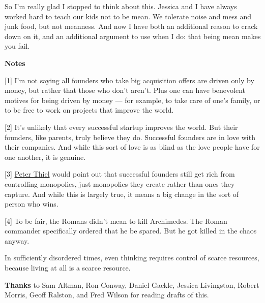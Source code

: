 So I'm really glad I stopped to think about this. Jessica and I have
always worked hard to teach our kids not to be mean. We tolerate noise
and mess and junk food, but not meanness. And now I have both an
additional reason to crack down on it, and an additional argument to use
when I do: that being mean makes you fail.

\textbf{Notes}

{[}1{]} I'm not saying all founders who take big acquisition offers are
driven only by money, but rather that those who don't aren't. Plus one
can have benevolent motives for being driven by money --- for example,
to take care of one's family, or to be free to work on projects that
improve the world.

{[}2{]} It's unlikely that every successful startup improves the world.
But their founders, like parents, truly believe they do. Successful
founders are in love with their companies. And while this sort of love
is as blind as the love people have for one another, it is genuine.

{[}3{]} \href{http://startupclass.samaltman.com/courses/lec05}{Peter
Thiel} would point out that successful founders still get rich from
controlling monopolies, just monopolies they create rather than ones
they capture. And while this is largely true, it means a big change in
the sort of person who wins.

{[}4{]} To be fair, the Romans didn't mean to kill Archimedes. The Roman
commander specifically ordered that he be spared. But he got killed in
the chaos anyway.

In sufficiently disordered times, even thinking requires control of
scarce resources, because living at all is a scarce resource.

\textbf{Thanks} to Sam Altman, Ron Conway, Daniel Gackle, Jessica
Livingston, Robert Morris, Geoff Ralston, and Fred Wilson for reading
drafts of this.
